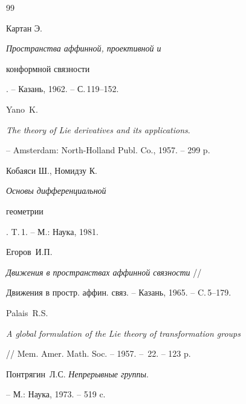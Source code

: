 \begin{thebibliography}{99}






Картан Э. {\em Пространства аффинной, проективной и


конформной связности}. -- Казань, 1962. -- С.\,119--152.







Yano~K.


{\em The theory of Lie derivatives and its applications}.


-- Amsterdam: North-Holland Publ. Co., 1957. -- 299 p.















Кобаяси Ш., Номидзу К. {\em Основы дифференциальной


геометрии}. T.\,1. -- М.: Наука, 1981.









Егоров~И.П.


{\em Движения в пространствах аффинной связности} //


Движения в простр. аффин. связ. -- Казань, 1965. -- C.\,5--179.









Palais~R.S.


{\em A global formulation of the Lie theory of transformation groups}


// Mem. Amer. Math. Soc. -- 1957. -- \No\,22. -- 123 p.







Понтрягин~Л.С. {\em Непрерывные группы}.


-- М.: Наука, 1973. -- 519 c.





\end{thebibliography}





